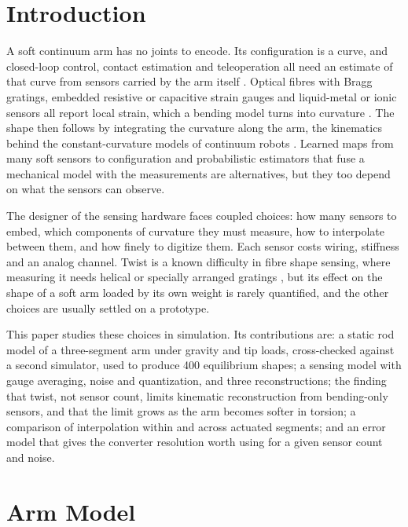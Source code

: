 \documentclass[conference]{IEEEtran}
\begin{document}
\section{Introduction}

A soft continuum arm has no joints to encode. Its configuration is a curve,
and closed-loop control, contact estimation and teleoperation all need an
estimate of that curve from sensors carried by the arm itself
\cite{dellasantina2023survey}. Optical fibres with Bragg gratings, embedded
resistive or capacitive strain gauges and liquid-metal or ionic sensors all
report local strain, which a bending model turns into curvature
\cite{shi2017survey, galloway2019fiber}. The shape then follows by
integrating the curvature along the arm, the kinematics behind the
constant-curvature models of continuum robots \cite{webster2010review}.
Learned maps from many soft sensors to configuration
\cite{thuruthel2019perception, truby2020proprioception} and probabilistic
estimators that fuse a mechanical model with the measurements
\cite{lilge2022gp} are alternatives, but they too depend on what the sensors
can observe.

The designer of the sensing hardware faces coupled choices: how many sensors
to embed, which components of curvature they must measure, how to
interpolate between them, and how finely to digitize them. Each sensor costs
wiring, stiffness and an analog channel. Twist is a known difficulty in fibre
shape sensing, where measuring it needs helical or specially arranged
gratings \cite{xu2016helical}, but its effect on the shape of a soft arm
loaded by its own weight is rarely quantified, and the other choices are
usually settled on a prototype.

This paper studies these choices in simulation. Its contributions are: a
static rod model of a three-segment arm under gravity and tip loads,
cross-checked against a second simulator, used to produce 400 equilibrium
shapes; a sensing model with gauge averaging, noise and quantization, and
three reconstructions; the finding that twist, not sensor count, limits
kinematic reconstruction from bending-only sensors, and that the limit grows
as the arm becomes softer in torsion; a comparison of interpolation within
and across actuated segments; and an error model that gives the converter
resolution worth using for a given sensor count and noise.

\section{Arm Model}
\end{document}
